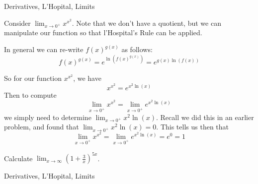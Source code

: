 
\begin{tagblock}{Derivatives, L'Hopital, Limits}

\begin{question}

Consider $\displaystyle \lim_{x\to 0^+} {x}^{x^2}$.  Note that we don't have a quotient, but we can manipulate our function so that l'Hospital's Rule can be applied.

In general we can re-write $f(x)^{g(x)}$ as follows:
\[f(x)^{g(x)} = e^{\ln (f(x)^{g(x)})} = e^{g(x) \ln (f(x))}  \]

So for our function $ {x}^{x^2}$, we have
\[  {x}^{x^2} = e^{x^2 \ln(x)} \]
Then to compute 
\[ \lim_{x\to 0^+} {x}^{x^2} =  \lim_{x\to 0^+}  e^{x^2 \ln(x)} \]
we simply need to determine $ \lim_{x\to 0^+} {x^2 \ln(x)}$.  Recall we did this in an earlier problem, and found that $ \lim_{x\to 0^+} {x^2 \ln(x)} = 0$.  This tells us then that
\[ \lim_{x\to 0^+} {x}^{x^2} =  \lim_{x\to 0^+}  e^{x^2 \ln(x)}   = e^0 = 1\]

\bigskip

Calculate $\displaystyle\lim_{x\to \infty} (1+ \frac{3}{x})^{5x}$.  


	
\begin{tags}
	   Derivatives, L'Hopital, Limits

\end{tags}
	
\begin{diary}
\end{diary}
	
\begin{solution}
	   
\end{solution}
	
\end{question}

\end{tagblock}


